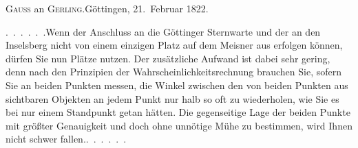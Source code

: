 \begin{center}
\textsc{Gauss} an \textsc{Gerling}.\quad Göttingen, 21.~Februar 1822.
\end{center}

\par\noindent\hspace*{\parindent}\mbox{.\ .\ .\ .\ .\ .}\quad Wenn der Anschluss an die Göttinger Sternwarte und der an den Inselsberg nicht von einem einzigen Platz auf dem Meisner aus erfolgen können, dürfen Sie nun  Plätze nutzen.
Der zusätzliche Aufwand ist dabei sehr gering, denn nach den Prinzipien der Wahrscheinlichkeitsrechnung brauchen Sie, sofern Sie an beiden Punkten messen, die Winkel zwischen den von beiden Punkten aus sichtbaren Objekten an jedem Punkt nur halb so oft zu wiederholen, wie Sie es bei nur einem Standpunkt getan hätten.
Die gegenseitige Lage der beiden Punkte mit größter Genauigkeit und doch ohne unnötige Mühe zu bestimmen, wird Ihnen nicht schwer \mbox{fallen.\quad.\ .\ .\ .\ .\ .}
